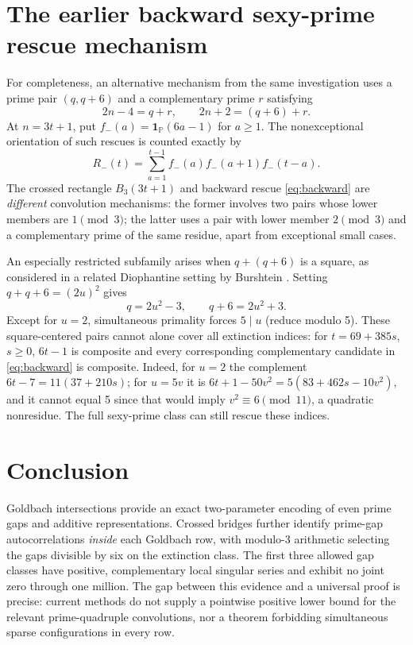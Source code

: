 \documentclass[11pt,a4paper]{article}
\theoremstyle{definition}
\newcommand{\PP}{\mathbb P}
\newcommand{\one}{\mathbf 1}
\begin{document}
\section{The earlier backward sexy-prime rescue mechanism}
For completeness, an alternative mechanism from the same investigation uses a prime pair $(q,q+6)$ and a complementary prime $r$ satisfying
\[
 2n-4=q+r,\qquad 2n+2=(q+6)+r.
\]
At $n=3t+1$, put $f_-(a)=\one_{\PP}(6a-1)$ for $a\ge1$. The nonexceptional orientation of such rescues is counted exactly by
\begin{equation}\label{eq:backward}
 R_-(t)=\sum_{a=1}^{t-1}f_-(a)f_-(a+1)f_-(t-a).
\end{equation}
The crossed rectangle $B_3(3t+1)$ and backward rescue \eqref{eq:backward} are \emph{different} convolution mechanisms: the former involves two pairs whose lower members are $1\pmod3$; the latter uses a pair with lower member $2\pmod3$ and a complementary prime of the same residue, apart from exceptional small cases.

An especially restricted subfamily arises when $q+(q+6)$ is a square, as considered in a related Diophantine setting by Burshtein \cite{Burshtein2018}. Setting $q+q+6=(2u)^2$ gives
\[
 q=2u^2-3,\qquad q+6=2u^2+3.
\]
Except for $u=2$, simultaneous primality forces $5\mid u$ (reduce modulo 5). These square-centered pairs cannot alone cover all extinction indices: for $t=69+385s$, $s\ge0$, $6t-1$ is composite and every corresponding complementary candidate in \eqref{eq:backward} is composite. Indeed, for $u=2$ the complement $6t-7=11(37+210s)$; for $u=5v$ it is $6t+1-50v^2=5(83+462s-10v^2)$, and it cannot equal 5 since that would imply $v^2\equiv6\pmod{11}$, a quadratic nonresidue. The full sexy-prime class can still rescue these indices.

\section*{Conclusion}
Goldbach intersections provide an exact two-parameter encoding of even prime gaps and additive representations. Crossed bridges further identify prime-gap autocorrelations \emph{inside} each Goldbach row, with modulo-3 arithmetic selecting the gaps divisible by six on the extinction class. The first three allowed gap classes have positive, complementary local singular series and exhibit no joint zero through one million. The gap between this evidence and a universal proof is precise: current methods do not supply a pointwise positive lower bound for the relevant prime-quadruple convolutions, nor a theorem forbidding simultaneous sparse configurations in every row.

\printbibliography
\end{document}
